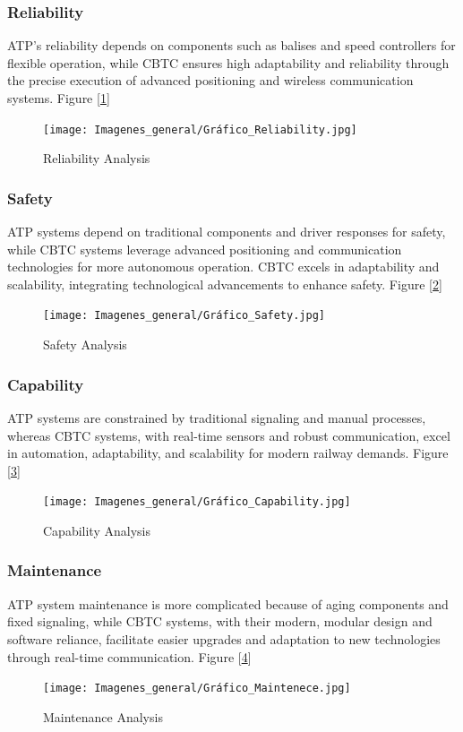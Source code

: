 \documentclass[conference]{IEEEtran}
\begin{document}
\subsubsection{Reliability}
ATP's reliability depends on components such as balises and speed controllers for flexible operation, while CBTC ensures high adaptability and reliability through the precise execution of advanced positioning and wireless communication systems. Figure [\ref{fig:Reliability Analysis}]\\
\begin{figure}[htbp]
 \centering
        \texttt{[image: Imagenes\_general/Gráfico\_Reliability.jpg]}
\caption{Reliability Analysis}
 \label{fig:Reliability Analysis}
\end{figure}

\subsubsection{Safety}
ATP systems depend on traditional components and driver responses for safety, while CBTC systems leverage advanced positioning and communication technologies for more autonomous operation. CBTC excels in adaptability and scalability, integrating technological advancements to enhance safety. Figure [\ref{fig:Safety Analysis}]\\
\begin{figure}[htbp]
    \centering
    \texttt{[image: Imagenes\_general/Gráfico\_Safety.jpg]}
    \caption{Safety Analysis}
    \label{fig:Safety Analysis}
\end{figure}
\subsubsection{Capability}

ATP systems are constrained by traditional signaling and manual processes, whereas CBTC systems, with real-time sensors and robust communication, excel in automation, adaptability, and scalability for modern railway demands. Figure [\ref{fig:Capability Analysis}]\\
\begin{figure}[htbp]
    \centering
    \texttt{[image: Imagenes\_general/Gráfico\_Capability.jpg]}
    \caption{Capability Analysis}
    \label{fig:Capability Analysis}
\end{figure}

\subsubsection{Maintenance}
ATP system maintenance is more complicated because of aging components and fixed signaling, while CBTC systems, with their modern, modular design and software reliance, facilitate easier upgrades and adaptation to new technologies through real-time communication. Figure [\ref{fig:Maintenance Analysis}]
\begin{figure}[htbp]
    \centering
        \texttt{[image: Imagenes\_general/Gráfico\_Maintenece.jpg]}
    \caption{Maintenance Analysis}
    \label{fig:Maintenance Analysis}
\end{figure}
\end{document}
